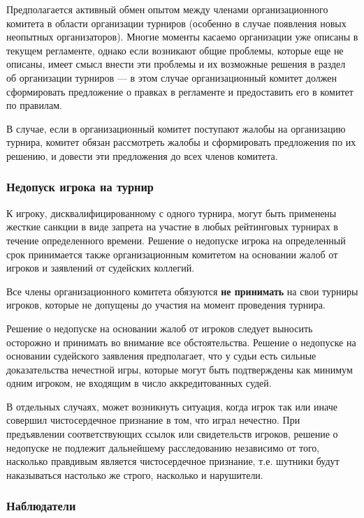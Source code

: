 Предполагается активный обмен опытом между членами организационного комитета в области организации турниров (особенно в случае появления новых неопытных организаторов). Многие моменты касаемо организации уже описаны в текущем регламенте, однако если возникают общие проблемы, которые еще не описаны, имеет смысл внести эти проблемы и их возможные решения в раздел об организации турниров --- в этом случае организационный комитет должен сформировать предложение о правках в регламенте и предоставить его в комитет по правилам.

В случае, если в организационный комитет поступают жалобы на организацию турнира, комитет обязан рассмотреть жалобы и сформировать предложения по их решению, и довести эти предложения до всех членов комитета.

\subsubsection{Недопуск игрока на турнир}

К игроку, дисквалифицированному с одного турнира, могут быть применены жесткие санкции в виде запрета на участие в любых рейтинговых турнирах в течение определенного времени. Решение о недопуске игрока на определенный срок принимается также организационным комитетом на основании жалоб от игроков и заявлений от судейских коллегий.

Все члены организационного комитета обязуются \textbf{не принимать} на свои турниры игроков, которые не допущены до участия на момент проведения турнира.

Решение о недопуске на основании жалоб от игроков следует выносить осторожно и принимать во внимание все обстоятельства. Решение о недопуске на основании судейского заявления предполагает, что у судьи есть сильные доказательства нечестной игры, которые могут быть подтверждены как минимум одним игроком, не входящим в число аккредитованных судей.

В отдельных случаях, может возникнуть ситуация, когда игрок так или иначе совершил чистосердечное признание в том, что играл нечестно. При предъявлении соответствующих ссылок или свидетельств игроков, решение о недопуске не подлежит дальнейшему расследованию независимо от того, насколько правдивым является чистосердечное признание, т.е. шутники будут наказываться настолько же строго, насколько и нарушители.

\subsubsection{Наблюдатели}

